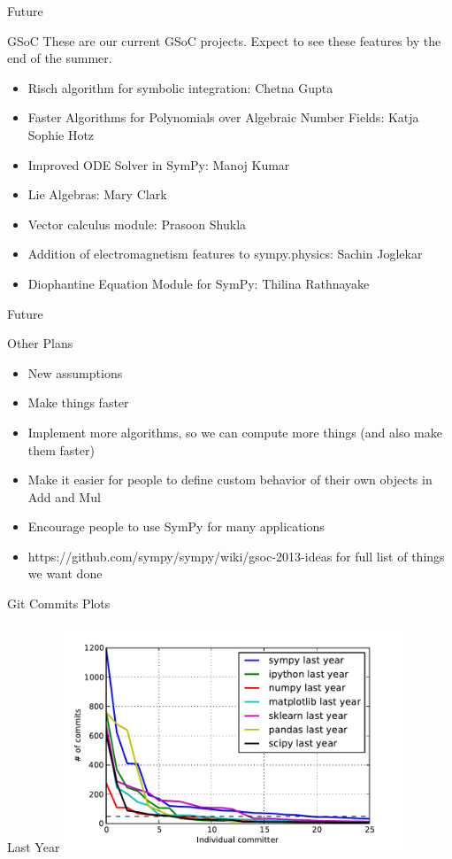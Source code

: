 \documentclass[xcolor=svgnames]{beamer}
\begin{document}
\begin{frame}{Future}
  \begin{block}{GSoC}
    These are our current GSoC projects. Expect to see these features by the end
    of the summer.
    \begin{itemize}
    \item \normalsize Risch algorithm for symbolic integration: \small Chetna Gupta
    \item \normalsize Faster Algorithms for Polynomials over Algebraic Number Fields: \small Katja Sophie Hotz
    \item \normalsize Improved ODE Solver in SymPy: \small Manoj Kumar
    \item \normalsize Lie Algebras: \small Mary Clark
    \item \normalsize Vector calculus module: \small Prasoon Shukla
    \item \normalsize Addition of electromagnetism features to sympy.physics: \small Sachin Joglekar
    \item \normalsize Diophantine Equation Module for SymPy: \small Thilina Rathnayake
    \end{itemize}
  \end{block}
\end{frame}

\begin{frame}{Future}
\begin{block}{Other Plans}
\begin{itemize}
\item New assumptions
\item Make things faster
\item Implement more algorithms, so we can compute more things (and also make
  them faster)
\item Make it easier for people to define custom behavior of their own objects
  in Add and Mul
\item Encourage people to use SymPy for many applications
\item https://github.com/sympy/sympy/wiki/gsoc-2013-ideas for full list of
  things we want done
\end{itemize}
\end{block}
\end{frame}

\begin{frame}{Git Commits Plots}
  \begin{block}{Last Year}
    \includegraphics[width=4in]{commits1.pdf}
  \end{block}
\end{frame}
\end{document}
